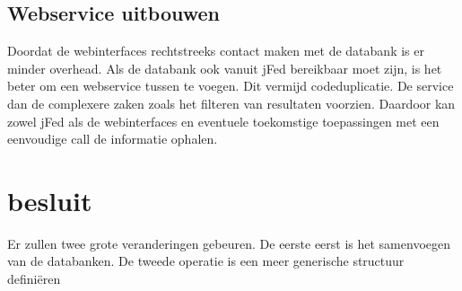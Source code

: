 \subsection{Webservice uitbouwen}
\npar
Doordat de webinterfaces rechtstreeks contact maken met de databank is er minder overhead. Als de databank ook vanuit jFed bereikbaar moet zijn, is het beter om een webservice tussen te voegen. Dit vermijd codeduplicatie. De service dan de complexere zaken zoals het filteren van resultaten voorzien. Daardoor kan zowel jFed als de webinterfaces en eventuele toekomstige toepassingen met een eenvoudige call de informatie ophalen.

\section{besluit}
\npar
Er zullen twee grote veranderingen gebeuren. De eerste eerst is het samenvoegen van de databanken. De tweede operatie is een meer generische structuur defini\"eren